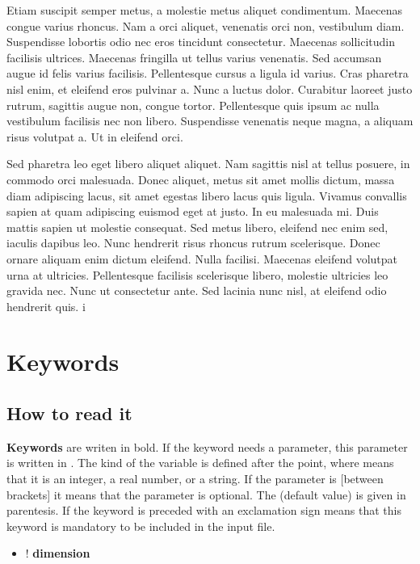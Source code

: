 \documentclass[letterpaper,10pt,english]{sphinxmanual}
\begin{document}
Etiam suscipit semper metus, a molestie metus aliquet condimentum. Maecenas
congue varius rhoncus. Nam a orci aliquet, venenatis orci non, vestibulum diam.
Suspendisse lobortis odio nec eros tincidunt consectetur. Maecenas sollicitudin
facilisis ultrices. Maecenas fringilla ut tellus varius venenatis. Sed accumsan
augue id felis varius facilisis. Pellentesque cursus a ligula id varius. Cras
pharetra nisl enim, et eleifend eros pulvinar a. Nunc a luctus dolor. Curabitur
laoreet justo rutrum, sagittis augue non, congue tortor. Pellentesque quis
ipsum ac nulla vestibulum facilisis nec non libero. Suspendisse venenatis neque
magna, a aliquam risus volutpat a. Ut in eleifend orci.

Sed pharetra leo eget libero aliquet aliquet. Nam sagittis nisl at tellus
posuere, in commodo orci malesuada. Donec aliquet, metus sit amet mollis
dictum, massa diam adipiscing lacus, sit amet egestas libero lacus quis ligula.
Vivamus convallis sapien at quam adipiscing euismod eget at justo. In eu
malesuada mi. Duis mattis sapien ut molestie consequat. Sed metus libero,
eleifend nec enim sed, iaculis dapibus leo. Nunc hendrerit risus rhoncus rutrum
scelerisque. Donec ornare aliquam enim dictum eleifend. Nulla facilisi.
Maecenas eleifend volutpat urna at ultricies. Pellentesque facilisis
scelerisque libero, molestie ultricies leo gravida nec. Nunc ut consectetur
ante. Sed lacinia nunc nisl, at eleifend odio hendrerit quis.  i


\chapter{Keywords}
\label{keywords:keywords}\label{keywords::doc}

\section{How to read it}
\label{keywords:how-to-read-it}
\textbf{Keywords} are writen in bold. If the keyword needs a parameter, this
parameter is written in . The kind of the variable is defined
after the point, where  means that it is an integer,  a real
number, or  a string. If the parameter is {[}between brackets{]} it means
that the parameter is optional. The (default value) is given in parentesis.
If the keyword is preceded with an exclamation sign means that this keyword is
mandatory to be included in the input file.
\begin{itemize}
\item {} 
! \textbf{dimension} 

\end{itemize}
\end{document}

